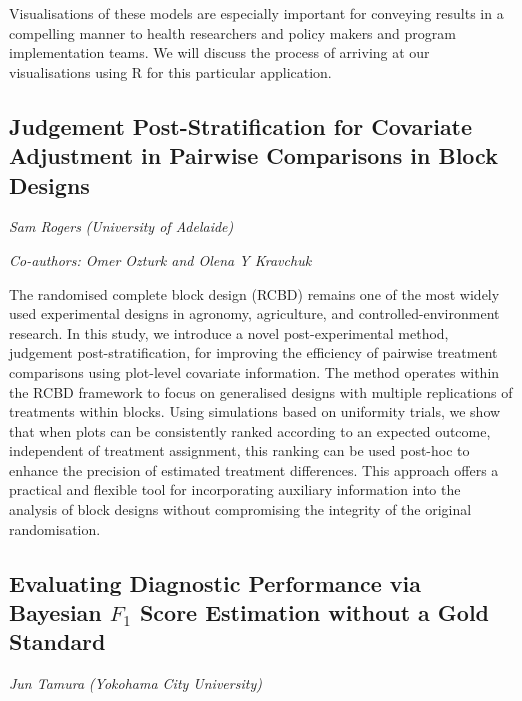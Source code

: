 \documentclass[
]{scrreprt}
\begin{document}
Visualisations of these models are especially important for conveying
results in a compelling manner to health researchers and policy makers
and program implementation teams. We will discuss the process of
arriving at our visualisations using R for this particular application.

\subsection{Judgement Post-Stratification for Covariate Adjustment in
Pairwise Comparisons in Block
Designs}\label{judgement-post-stratification-for-covariate-adjustment-in-pairwise-comparisons-in-block-designs}

\emph{Sam Rogers} \emph{(University of Adelaide)}

\emph{Co-authors: Omer Ozturk and Olena Y Kravchuk}

\setlength{\parskip}{0.5em}

The randomised complete block design (RCBD) remains one of the most
widely used experimental designs in agronomy, agriculture, and
controlled-environment research. In this study, we introduce a novel
post-experimental method, judgement post-stratification, for improving
the efficiency of pairwise treatment comparisons using plot-level
covariate information. The method operates within the RCBD framework to
focus on generalised designs with multiple replications of treatments
within blocks. Using simulations based on uniformity trials, we show
that when plots can be consistently ranked according to an expected
outcome, independent of treatment assignment, this ranking can be used
post-hoc to enhance the precision of estimated treatment differences.
This approach offers a practical and flexible tool for incorporating
auxiliary information into the analysis of block designs without
compromising the integrity of the original randomisation.

\subsection{\texorpdfstring{Evaluating Diagnostic Performance via
Bayesian \(F_1\) Score Estimation without a Gold
Standard}{Evaluating Diagnostic Performance via Bayesian F\_1 Score Estimation without a Gold Standard}}\label{evaluating-diagnostic-performance-via-bayesian-f_1-score-estimation-without-a-gold-standard}

\emph{Jun Tamura} \emph{(Yokohama City University)}
\end{document}
